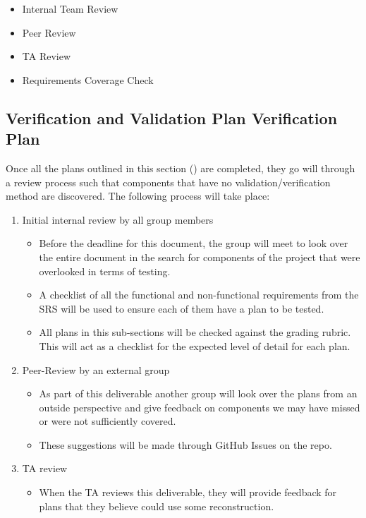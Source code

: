 \documentclass[12pt, titlepage]{article}
\begin{document}
\begin{itemize}
  \item Internal Team Review
  \item Peer Review
  \item TA Review
  \item Requirements Coverage Check
\end{itemize}

\subsection{Verification and Validation Plan Verification Plan}
\label{ssub:vnv_plan_verificaiton_plan}

Once all the plans outlined in this section () are completed, they go will through a review process such that components that have no validation/verification method are discovered. The following process will take place:

\begin{enumerate}
  \item Initial internal review by all group members
        \begin{itemize}
          \item Before the deadline for this document, the group will meet to look over the entire document in the search for components of the project that were overlooked in terms of testing.
          \item A checklist of all the functional and non-functional requirements from the SRS will be used to ensure each of them have a plan to be tested.
          \item All plans in this sub-sections will be checked against the grading rubric. This will act as a checklist for the expected level of detail for each plan.
        \end{itemize}
  \item Peer-Review by an external group
        \begin{itemize}
          \item As part of this deliverable another group will look over the plans from an outside perspective and give feedback on components we may have missed or were not sufficiently covered.
          \item These suggestions will be made through GitHub Issues on the repo.
        \end{itemize}
  \item TA review
        \begin{itemize}
          \item When the TA reviews this deliverable, they will provide feedback for plans that they believe could use some reconstruction.
        \end{itemize}
\end{enumerate}
\end{document}
